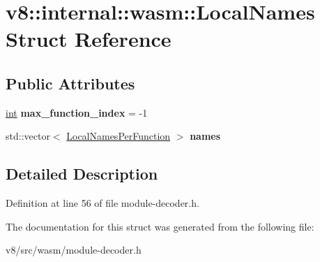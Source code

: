 \hypertarget{structv8_1_1internal_1_1wasm_1_1LocalNames}{}\section{v8\+:\+:internal\+:\+:wasm\+:\+:Local\+Names Struct Reference}
\label{structv8_1_1internal_1_1wasm_1_1LocalNames}
\subsection*{Public Attributes}
\begin{DoxyCompactItemize}
\item 
\mbox{\label{structv8_1_1internal_1_1wasm_1_1LocalNames_a6efb06a218b64a2790e1c5eb48b09f2e}} 
\mbox{\hyperlink{classint}{int}} {\bfseries max\+\_\+function\+\_\+index} = -\/1
\item 
\mbox{\label{structv8_1_1internal_1_1wasm_1_1LocalNames_a6332eb9fa14288645d8c0dbae8cc2b94}} 
std\+::vector$<$ \mbox{\hyperlink{structv8_1_1internal_1_1wasm_1_1LocalNamesPerFunction}{Local\+Names\+Per\+Function}} $>$ {\bfseries names}
\end{DoxyCompactItemize}


\subsection{Detailed Description}


Definition at line 56 of file module-\/decoder.\+h.



The documentation for this struct was generated from the following file\+:\begin{DoxyCompactItemize}
\item 
v8/src/wasm/module-\/decoder.\+h\end{DoxyCompactItemize}
